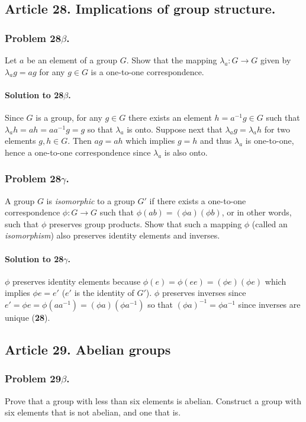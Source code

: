 \subsection{Article 28. Implications of group structure.}
\subsubsection{Problem 28$\beta$.}
Let $a$ be an element of a group $G$. Show that the mapping $ \lambda_a : G \rightarrow G$
given by $ \lambda_a g = ag$ for any $g \in G$ is a one-to-one correspondence.

\paragraph*{Solution to 28$\beta$.}
Since $G$ is a group, for any $g \in G$ there exists an element $h= a^{-1} g \in G$ such
that $ \lambda_a h = ah = aa^{-1}g = g$ so that $\lambda_a$ is onto. Suppose
next that $\lambda_a g = \lambda_a h$ for two elements $g, h \in G$. Then
$ ag = ah $ which implies $ g = h $ and thus $\lambda_a $ is one-to-one, hence
a one-to-one correspondence since $\lambda_a$ is also onto.

\subsubsection{Problem 28$\gamma$.}
A group $G$ is \textit{isomorphic} to a group $G'$ if there exists a one-to-one
correspondence $\phi : G \rightarrow G$ such that $ \phi(ab) = (\phi a) (\phi b)$,
or in other words, such that $\phi$ preserves group products. Show that such a
mapping $\phi$ (called an \textit{isomorphism}) also preserves identity elements
and inverses.

\paragraph*{Solution to 28$\gamma$.}
$\phi$ preserves identity elements because $\phi(e) = \phi(ee) = (\phi e)(\phi e)$
which implies $ \phi e = e'$ ($e'$ is the identity of $G'$). $\phi$ preserves
inverses since $e' = \phi e = \phi (a a^{-1}) = (\phi a)(\phi a^{-1})$ so that
$(\phi a)^{-1} = \phi a^{-1}$ since inverses are unique (\textbf{28}).

\subsection{Article 29. Abelian groups}
\subsubsection{Problem 29$\beta$.}
Prove that a group with less than six elements is abelian. Construct a group
with six elements that is not abelian, and one that is.

